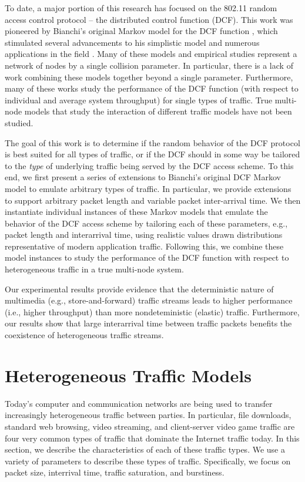\documentclass{llncs}
\begin{document}
To date, a major portion of this research has focused on the 802.11 random access control protocol -- the distributed control function (DCF). This work was pioneered by Bianchi's original Markov model for the DCF function \cite{bianchi1996performance}, which stimulated several advancements to his simplistic model \cite{bianchi1998ieee} and numerous applications in the field \cite{crow1996performance,chhaya1997performance}. Many of these models and empirical studies represent a network of nodes by a single collision parameter. In particular, there is a lack of work combining these models together beyond a single parameter. Furthermore, many of these works study the performance of the DCF function (with respect to individual and average system throughput) for single types of traffic. True multi-node models that study the interaction of different traffic models have not been studied.

The goal of this work is to determine if the random behavior of the DCF protocol is best suited for all types of traffic, or if the DCF should in some way be tailored to the \emph{type} of underlying traffic being served by the DCF access scheme. To this end, we first present a series of extensions to Bianchi's original DCF Markov model to emulate arbitrary types of traffic. In particular, we provide extensions to support arbitrary packet length and variable packet inter-arrival time. We then instantiate individual instances of these Markov models that emulate the behavior of the DCF access scheme by tailoring each of these parameters, e.g., packet length and interarrival time, using realistic values drawn distributions representative of modern application traffic. Following this, we combine these model instances to study the performance of the DCF function with respect to heterogeneous traffic in a true multi-node system. 

Our experimental results provide evidence that the deterministic nature of multimedia (e.g., store-and-forward) traffic streams leads to higher performance (i.e., higher throughput) than more nondeteministic (elastic) traffic. Furthermore, our results show that large interarrival time between traffic packets benefits the coexistence of heterogeneous traffic streams. 

\section{Heterogeneous Traffic Models}
Today's computer and communication networks are being used to transfer increasingly heterogeneous traffic between parties. In particular, file downloads, standard web browsing, video streaming, and client-server video game traffic are four very common types of traffic that dominate the Internet traffic today. In this section, we describe the characteristics of each of these traffic types. We use a variety of parameters to describe these types of traffic. Specifically, we focus on packet size, interrival time, traffic saturation, and burstiness. \\
\end{document}
